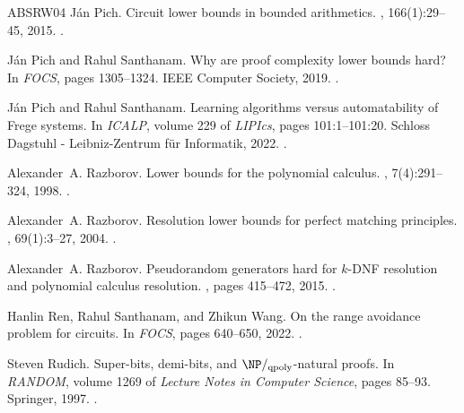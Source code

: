 \documentclass[10pt,a4paper]{article}
\theoremstyle{definition}
\theoremstyle{remark}
\begin{document}
\begin{thebibliography}{ABSRW04}
J{\'{a}}n Pich.
\newblock Circuit lower bounds in bounded arithmetics.
, 166(1):29--45, 2015.
\newblock \href {https://doi.org/10.1016/J.APAL.2014.08.004}
  {}.

J{\'{a}}n Pich and Rahul Santhanam.
\newblock Why are proof complexity lower bounds hard?
\newblock In {\em {FOCS}}, pages 1305--1324. {IEEE} Computer Society, 2019.
\newblock \href {https://doi.org/10.1109/FOCS.2019.00080}
  {}.

J{\'{a}}n Pich and Rahul Santhanam.
\newblock Learning algorithms versus automatability of {F}rege systems.
\newblock In {\em {ICALP}}, volume 229 of {\em LIPIcs}, pages 101:1--101:20.
  Schloss Dagstuhl - Leibniz-Zentrum f{\"{u}}r Informatik, 2022.
\newblock \href {https://doi.org/10.4230/LIPICS.ICALP.2022.101}
  {}.

Alexander~A. Razborov.
\newblock Lower bounds for the polynomial calculus.
, 7(4):291--324, 1998.
\newblock \href {https://doi.org/10.1007/s000370050013}
  {}.

Alexander~A. Razborov.
\newblock Resolution lower bounds for perfect matching principles.
, 69(1):3--27, 2004.
\newblock \href {https://doi.org/10.1016/J.JCSS.2004.01.004}
  {}.

Alexander~A. Razborov.
\newblock Pseudorandom generators hard for {$k$-DNF} resolution and polynomial
  calculus resolution.
, pages 415--472, 2015.
\newblock \href {https://doi.org/10.4007/annals.2015.181.2.1}
  {}.

Hanlin Ren, Rahul Santhanam, and Zhikun Wang.
\newblock On the range avoidance problem for circuits.
\newblock In {\em FOCS}, pages 640--650, 2022.
\newblock \href {https://doi.org/10.1109/FOCS54457.2022.00067}
  {}.

Steven Rudich.
\newblock Super-bits, demi-bits, and {$\NP/_{\mathrm{qpoly}}$}-natural proofs.
\newblock In {\em {RANDOM}}, volume 1269 of {\em Lecture Notes in Computer
  Science}, pages 85--93. Springer, 1997.
\newblock \href {https://doi.org/10.1007/3-540-63248-4\_8}
  {}.


\end{thebibliography}
\end{document}
